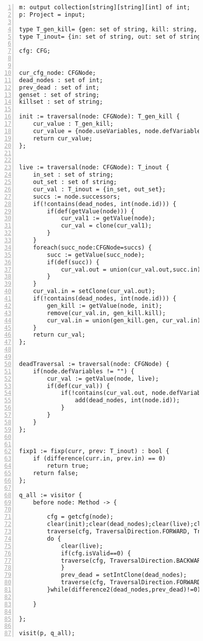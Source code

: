 \begin{figure}[ht!]
\begin{lstlisting}[numbers=left, tabsize=4, escapechar=@, caption={Dead code},label={lst:dead-code}, lastline = 55] 
m: output collection[string][string][int] of int;
p: Project = input;

type T_gen_kill= {gen: set of string, kill: string, dummy : int};
type T_inout= {in: set of string, out: set of string};

cfg: CFG;


cur_cfg_node: CFGNode;
dead_nodes : set of int;
prev_dead : set of int;
genset : set of string;
killset : set of string;

init := traversal(node: CFGNode): T_gen_kill {
	cur_value : T_gen_kill;
	cur_value = {node.useVariables, node.defVariables, 0};
	return cur_value;
};


live := traversal(node: CFGNode): T_inout {
	in_set : set of string;
	out_set : set of string;
	cur_val : T_inout = {in_set, out_set};
	succs := node.successors;
	if(!contains(dead_nodes, int(node.id))) {
		if(def(getValue(node))) {
			cur_val1 := getValue(node);
			cur_val = clone(cur_val1);
		}
	}
	foreach(succ_node:CFGNode=succs) {
		succ := getValue(succ_node);
		if(def(succ)) {
			cur_val.out = union(cur_val.out,succ.in);
		}
	}
	cur_val.in = setClone(cur_val.out);
	if(!contains(dead_nodes, int(node.id))) {
		gen_kill := getValue(node, init);
		remove(cur_val.in, gen_kill.kill);
		cur_val.in = union(gen_kill.gen, cur_val.in);
	}
	return cur_val;
};


deadTraversal := traversal(node: CFGNode) {
	if(node.defVariables != "") {
		cur_val := getValue(node, live);
		if(def(cur_val)) {
			if(!contains(cur_val.out, node.defVariables)) {
				add(dead_nodes, int(node.id));
			}
		}
	}
};


fixp1 := fixp(curr, prev: T_inout) : bool {
	if (difference(curr.in, prev.in) == 0)
		return true;	
	return false;
};

q_all := visitor {
	before node: Method -> {
		
		cfg = getcfg(node);
		clear(init);clear(dead_nodes);clear(live);clear(prev_dead);
		traverse(cfg, TraversalDirection.FORWARD, TraversalKind.HYBRID, init);
		do {
			clear(live);
			if(cfg.isValid==0) {
			traverse(cfg, TraversalDirection.BACKWARD, TraversalKind.HYBRID, live, fixp1);
			}
			prev_dead = setIntClone(dead_nodes);
			traverse(cfg, TraversalDirection.FORWARD, TraversalKind.HYBRID, deadTraversal);
		}while(difference2(dead_nodes,prev_dead)!=0);
		
	}

};

visit(p, q_all);
\end{lstlisting}
\end{figure}